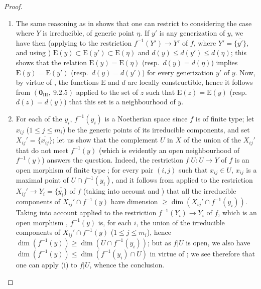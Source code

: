 \begin{proof}
\begin{enumerate}[label=(\roman*)]
  \item The same reasoning as in  shows that one can restrict to considering the case where $Y$ is irreducible, of generic point $\eta$.
  If $y'$ is any generization of $y$, we have then (applying  to the restriction $f^{-1}(Y')\to Y'$ of $f$, where $Y'=\overline{\{y'\}}$, and using ) $\mathrm{E}(y)\subset\mathrm{E}(y')\subset\mathrm{E}(\eta)$ and $d(y)\leq d(y')\leq d(\eta)$; this shows that the relation $\mathrm{E}(y)=\mathrm{E}(\eta)$ (resp.\ $d(y)=d(\eta)$) implies $\mathrm{E}(y)=\mathrm{E}(y')$ (resp.\ $d(y)=d(y')$) for every generization $y'$ of $y$.
  Now, by virtue of , the functions $\mathrm{E}$ and $d$ are locally constructible, hence it follows from $(\mathbf{0}_{\mathrm{III}},~9.2.5)$ applied to the set of $z$ such that $\mathrm{E}(z)=\mathrm{E}(y)$ (resp.\ $d(z)=d(y)$) that this set is a neighbourhood of $y$.

  \item For each of the $y_i$, $f^{-1}(y_i)$ is a Noetherian space since $f$ is of finite type; let $x_{ij}$ ($1\leq j\leq m_i$) be the generic points of its irreducible components, and set $X_{ij}'=\overline{\{x_{ij}\}}$; let us show that the complement $U$ in $X$ of the union of the $X_{ij}'$ that do not meet $f^{-1}(y)$ (which is evidently an open neighbourhood of $f^{-1}(y)$) answers the question.
  Indeed, the restriction $f|U:U\to Y$ of $f$ is an open morphism of finite type ; for every pair $(i,j)$ such that $x_{ij}\in U$, $x_{ij}$ is a maximal point of $U\cap f^{-1}(y_i)$, and it follows from  applied to the restriction $X_{ij}'\to Y_i=\overline{\{y_i\}}$ of $f$ (taking into account  and ) that all the irreducible components of $X_{ij}'\cap f^{-1}(y)$ have dimension $\geq\dim(X_{ij}'\cap f^{-1}(y_i))$.
  Taking into account  applied to the restriction $f^{-1}(Y_i)\to Y_i$ of $f$, which is an open morphism , $f^{-1}(y)$ is, for each $i$, the union of the irreducible components of $X_{ij}'\cap f^{-1}(y)$ ($1\leq j\leq m_i$), hence $\dim(f^{-1}(y))\geq\dim(U\cap f^{-1}(y_i))$; but as $f|U$ is open, we also have $\dim(f^{-1}(y))\leq\dim(f^{-1}(y_i)\cap U)$ in virtue of ; we see therefore that one can apply (i) to $f|U$, whence the conclusion.
\end{enumerate}
\end{proof}

